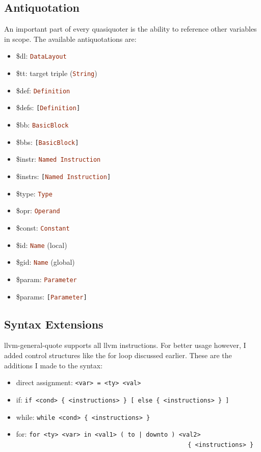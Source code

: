 \documentclass[a4paper,bibliography=totocnumbered,parskip,headsepline]{scrbook}
\begin{document}
\subsection{Antiquotation}
An important part of every quasiquoter is the ability to reference other variables in scope.
The available antiquotations are:
\begin{itemize}[noitemsep]
\item \$dl: \lstinline[language=haskell]!DataLayout!
\item \$tt: target triple (\lstinline[language=haskell]!String!)
\item \$def: \lstinline[language=haskell]!Definition!
\item \$defs: \lstinline[language=haskell]![Definition]!
\item \$bb: \lstinline[language=haskell]!BasicBlock!
\item \$bbs: \lstinline[language=haskell]![BasicBlock]!
\item \$instr: \lstinline[language=haskell]!Named Instruction!
\item \$instrs: \lstinline[language=haskell]![Named Instruction]!
\item \$type: \lstinline[language=haskell]!Type!
\item \$opr: \lstinline[language=haskell]!Operand!
\item \$const: \lstinline[language=haskell]!Constant!
\item \$id: \lstinline[language=haskell]!Name! (local)
\item \$gid: \lstinline[language=haskell]!Name! (global)
\item \$param: \lstinline[language=haskell]!Parameter!
\item \$params: \lstinline[language=haskell]![Parameter]!
\end{itemize}

\subsection{Syntax Extensions}
llvm-general-quote supports all llvm instructions.
For better usage however, I added control structures like the for loop discussed earlier.
These are the additions I made to the syntax:
\begin{itemize}[noitemsep]
 \item direct assignment: \lstinline!<var> = <ty> <val>!
 \item if: \lstinline!if <cond> { <instructions> } [ else { <instructions> } ]!
 \item while: \lstinline!while <cond> { <instructions> }!
 \item for: \lstinline[deletekeywords={to}]!for <ty> <var> in <val1> ( to | downto ) <val2>!\\ \lstinline!                                               { <instructions> }!
\end{itemize}
\end{document}
